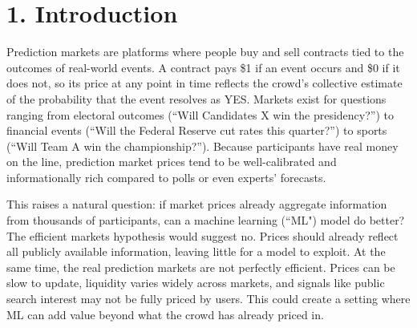 \documentclass[11pt,twocolumn]{article}
\begin{document}


\section*{1. Introduction}

Prediction markets are platforms where people buy and sell contracts tied to the outcomes of real-world events. A contract pays \$1 if an event occurs and \$0 if it does not, so its price at any point in time reflects the crowd's collective estimate of the probability that the event resolves as YES. Markets exist for questions ranging from electoral outcomes (``Will Candidates X win the presidency?'') to financial events (``Will the Federal Reserve cut rates this quarter?'') to sports (``Will Team A win the championship?''). Because participants have real money on the line, prediction market prices tend to be well-calibrated and informationally rich compared to polls or even experts' forecasts.

This raises a natural question: if market prices already aggregate information from thousands of participants, can a machine learning (``ML") model do better? The efficient markets hypothesis would suggest no. Prices should already reflect all publicly available information, leaving little for a model to exploit. At the same time, the real prediction markets are not perfectly efficient. Prices can be slow to update, liquidity varies widely across markets, and signals like public search interest may not be fully priced by users. This could create a setting where ML can add value beyond what the crowd has already priced in.
\end{document}
